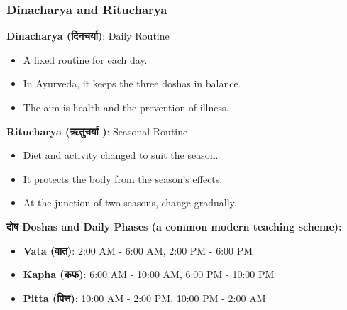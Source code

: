 \begin{frame}[fragile]\frametitle{Dinacharya and Ritucharya}
    \textbf{Dinacharya (दिनचर्या)}: Daily Routine
    \begin{itemize}
        \item A fixed routine for each day.
        \item In Ayurveda, it keeps the three doshas in balance.
        \item The aim is health and the prevention of illness.
    \end{itemize}

    \textbf{Ritucharya (ऋतुचर्या )}: Seasonal Routine
    \begin{itemize}
        \item Diet and activity changed to suit the season.
        \item It protects the body from the season's effects.
        \item At the junction of two seasons, change gradually.
    \end{itemize}

    \textbf{दोष  Doshas and Daily Phases (a common modern teaching scheme):}
    \begin{itemize}
        \item \textbf{Vata (वात)}: 2:00 AM - 6:00 AM, 2:00 PM - 6:00 PM
        \item \textbf{Kapha (कफ)}: 6:00 AM - 10:00 AM, 6:00 PM - 10:00 PM
        \item \textbf{Pitta (पित्त)}: 10:00 AM - 2:00 PM, 10:00 PM - 2:00 AM
    \end{itemize}
\end{frame}

